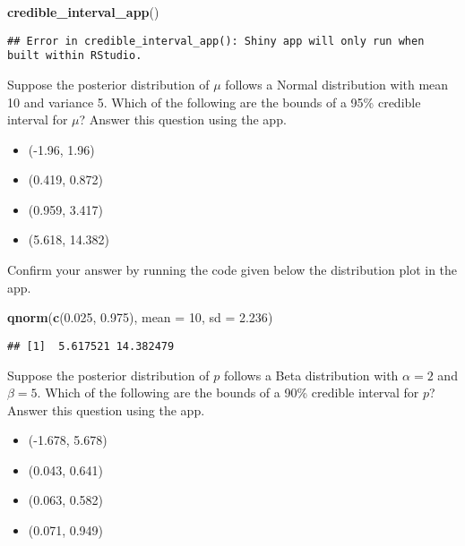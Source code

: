 \documentclass[
]{article}
\newenvironment{Shaded}{\begin{snugshade}}{\end{snugshade}}
\newcommand{\DataTypeTok}[1]{\textcolor[rgb]{0.13,0.29,0.53}{#1}}
\newcommand{\DecValTok}[1]{\textcolor[rgb]{0.00,0.00,0.81}{#1}}
\newcommand{\FloatTok}[1]{\textcolor[rgb]{0.00,0.00,0.81}{#1}}
\newcommand{\KeywordTok}[1]{\textcolor[rgb]{0.13,0.29,0.53}{\textbf{#1}}}
\newcommand{\NormalTok}[1]{#1}
\providecommand{\tightlist}{%
  \setlength{\itemsep}{0pt}\setlength{\parskip}{0pt}}
\begin{document}
\begin{Shaded}
\begin{Highlighting}[]
\KeywordTok{credible_interval_app}\NormalTok{()}
\end{Highlighting}
\end{Shaded}

\begin{verbatim}
## Error in credible_interval_app(): Shiny app will only run when built within RStudio.
\end{verbatim}

Suppose the posterior distribution of \(\mu\) follows a Normal
distribution with mean 10 and variance 5. Which of the following are the
bounds of a 95\% credible interval for \(\mu\)? Answer this question
using the app.

\begin{itemize}
\tightlist
\item
  (-1.96, 1.96)
\item
  (0.419, 0.872)
\item
  (0.959, 3.417)
\item
  (5.618, 14.382)
\end{itemize}

Confirm your answer by running the code given below the distribution
plot in the app.

\begin{Shaded}
\begin{Highlighting}[]
\KeywordTok{qnorm}\NormalTok{(}\KeywordTok{c}\NormalTok{(}\FloatTok{0.025}\NormalTok{, }\FloatTok{0.975}\NormalTok{), }\DataTypeTok{mean =} \DecValTok{10}\NormalTok{, }\DataTypeTok{sd =} \FloatTok{2.236}\NormalTok{)}
\end{Highlighting}
\end{Shaded}

\begin{verbatim}
## [1]  5.617521 14.382479
\end{verbatim}

Suppose the posterior distribution of \(p\) follows a Beta distribution
with \(\alpha = 2\) and \(\beta = 5\). Which of the following are the
bounds of a 90\% credible interval for \(p\)? Answer this question using
the app.

\begin{itemize}
\tightlist
\item
  (-1.678, 5.678)
\item
  (0.043, 0.641)
\item
  (0.063, 0.582)
\item
  (0.071, 0.949)
\end{itemize}
\end{document}
